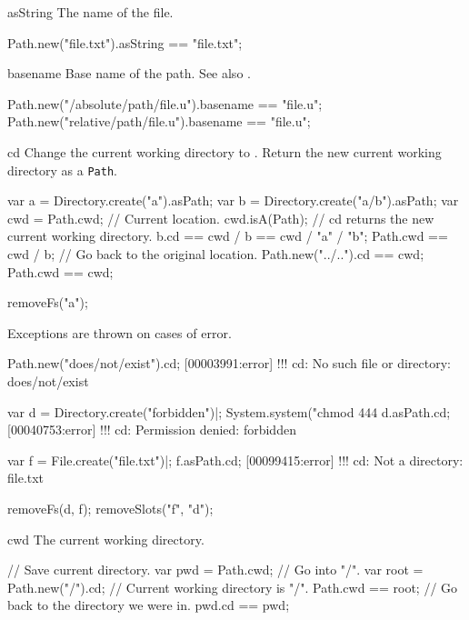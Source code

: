 \begin{urbiscriptapi}
\item[asString]
  The name of the file.
\begin{urbiassert}
Path.new("file.txt").asString == "file.txt";
\end{urbiassert}


\item[basename]%
  Base name of the path.  See also .
\begin{urbiassert}
Path.new("/absolute/path/file.u").basename == "file.u";
Path.new("relative/path/file.u").basename  == "file.u";
\end{urbiassert}


\item[cd]%
  Change the current working directory to \this. Return the new current
  working directory as a \lstinline|Path|.
\begin{urbiassert}
var a = Directory.create("a").asPath;
var b = Directory.create("a/b").asPath;
var cwd = Path.cwd;     // Current location.
cwd.isA(Path);
// cd returns the new current working directory.
b.cd == cwd / b == cwd / "a" / "b";
Path.cwd == cwd / b;
// Go back to the original location.
Path.new("../..").cd == cwd;
Path.cwd == cwd;
\end{urbiassert}
\begin{urbicomment}
removeFs("a");
\end{urbicomment}

Exceptions are thrown on cases of error.
\begin{urbiscript}
Path.new("does/not/exist").cd;
[00003991:error] !!! cd: No such file or directory: does/not/exist

var d = Directory.create("forbidden")|;
System.system("chmod 444 %
d.asPath.cd;
[00040753:error] !!! cd: Permission denied: forbidden

var f = File.create("file.txt")|;
f.asPath.cd;
[00099415:error] !!! cd: Not a directory: file.txt
\end{urbiscript}
\begin{urbicomment}
removeFs(d, f);
removeSlots("f", "d");
\end{urbicomment}

\item[cwd]%
  The current working directory.
\begin{urbiassert}
// Save current directory.
var pwd = Path.cwd;
// Go into "/".
var root = Path.new("/").cd;
// Current working directory is "/".
Path.cwd == root;
// Go back to the directory we were in.
pwd.cd == pwd;
\end{urbiassert}


\end{urbiscriptapi}
